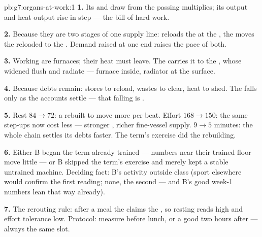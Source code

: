 \begin{solution}{pb:g7:organs-at-work:1}
\textbf{1.} Its  and  draw from the passing
 multiplies; its  output and heat
output rise in step --- the bill of hard work.

\textbf{2.} Because they are two stages of one supply
line:  reloads the  at the , the 
moves the reloaded  to the . Demand raised at
one end raises the pace of both.

\textbf{3.} Working  are furnaces; their heat must
leave. The  carries it to the , whose widened
 flush and radiate --- furnace inside, radiator at
the surface.

\textbf{4.} Because debts remain:  stores to
reload, wastes to clear, heat to shed. The  falls
only as the accounts settle --- that falling is .

\textbf{5.} Rest $84 \to 72$: a  rebuilt to move
more per beat. Effort $168 \to 150$: the same step-ups
now cost less --- stronger , richer fine-vessel
supply.  $9 \to 5$ minutes: the whole chain
settles its debts faster. The term's exercise did the
rebuilding.

\textbf{6.} Either B began the term already trained ---
numbers near their trained floor move little --- or B
skipped the term's exercise and merely kept a stable
untrained machine. Deciding fact: B's activity outside
class (sport elsewhere would confirm the first reading;
none, the second --- and B's good week-1 numbers lean
that way already).

\textbf{7.} The rerouting rule: after a meal the
 claims the , so resting  reads
high and effort tolerance low. Protocol: measure before
lunch, or a good two hours after --- always the same
slot.


\end{solution}
